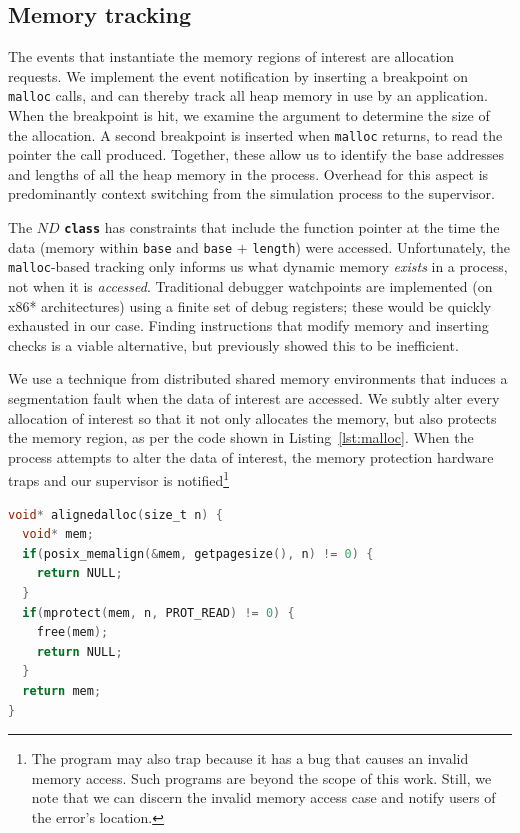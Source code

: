 \subsection{Memory tracking}

The events that instantiate the memory regions of interest are
allocation requests.  We implement the event notification by
inserting a breakpoint on \texttt{malloc} calls, and can thereby track
all heap memory in use by an application.  When the breakpoint is hit,
we examine the argument to determine the size of the allocation.  A
second breakpoint is inserted when
\texttt{malloc} returns, to read the pointer the call produced.
Together, these allow us to identify the base addresses and lengths
of all the heap memory in the process.  Overhead for this aspect is
predominantly context switching from the simulation process to the
supervisor.

The $ND$ \texttt{\textbf{class}} has constraints that include the
function pointer at the time the data (memory within \texttt{base} and
\texttt{base} $+$ \texttt{length}) were accessed.  Unfortunately, the
\texttt{malloc}-based tracking only informs us what dynamic memory
\emph{exists} in a process, not when it is \emph{accessed}.
Traditional debugger watchpoints are implemented (on x86*
architectures) using a finite set of debug registers; these would be
quickly exhausted in our case.  Finding instructions that modify memory
and inserting checks is a viable
alternative, but \cite{Antoniu:2001:PFault} previously showed this to
be inefficient.


We use a technique from distributed shared memory environments that
induces a segmentation fault when the data of interest are accessed.
We subtly alter every allocation of interest so that it not only
allocates the memory, but also protects the memory region, as per the code
shown in Listing~\ref{lst:malloc}.  When the process attempts to alter
the data of interest, the memory
protection hardware traps and our supervisor is notified\footnote{The
program may also trap because it has a bug that causes an invalid
memory access.  Such programs are beyond the scope of this work.
Still, we note that we can discern the invalid memory access case and
notify users of the error's location.}

\begin{lstlisting}[label=lst:malloc,language=C,caption=Replacement \texttt{malloc}
implementation used for tracking field access.]
void* alignedalloc(size_t n) {
  void* mem;
  if(posix_memalign(&mem, getpagesize(), n) != 0) {
    return NULL;
  }
  if(mprotect(mem, n, PROT_READ) != 0) {
    free(mem);
    return NULL;
  }
  return mem;
}
\end{lstlisting}

